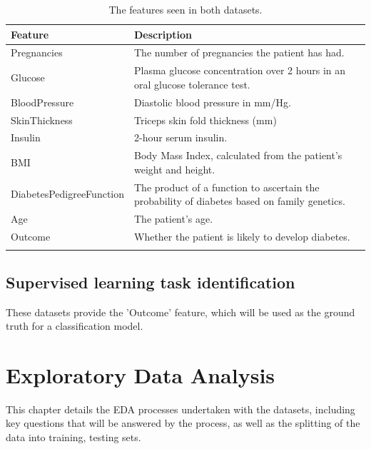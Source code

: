 \documentclass[12pt]{report}
\begin{document}
\begin{longtable}{ | p{} | p{} | }
    \hline
    \cellcolor{blue!25}Feature & \cellcolor{blue!25}Description \\
    \hline
    Pregnancies & The number of pregnancies the patient has had. \\
    \hline
    Glucose & Plasma glucose concentration over 2 hours in an oral glucose tolerance test. \\
    \hline
    BloodPressure & Diastolic blood pressure in mm/Hg. \\
    \hline
    SkinThickness & Triceps skin fold thickness (mm) \\
    \hline
    Insulin & 2-hour serum insulin. \\
    \hline
    BMI & Body Mass Index, calculated from the patient's weight and height. \\
    \hline
    DiabetesPedigreeFunction & The product of a function to ascertain the probability of diabetes based on family genetics. \autocite{akmese_diagnosing_2022} \\
    \hline
    Age & The patient's age.\\
    \hline
    Outcome & Whether the patient is likely to develop diabetes.\\
    \hline 
    \caption{The features seen in both datasets.}\label{tab:Features}
\end{longtable}


\section{Supervised learning task identification}
These datasets provide the 'Outcome' feature, which will be used as the ground truth for a 
classification model.


\chapter{Exploratory Data Analysis}
This chapter details the EDA processes undertaken with the datasets, including 
key questions that will be answered by the process, as well as the splitting of the 
data into training, testing %
sets.
\end{document}
